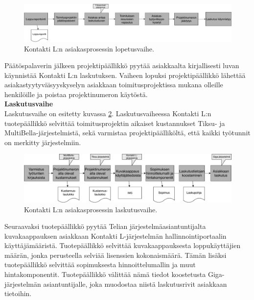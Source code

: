 \documentclass[finnish,12pt,a4paper,pdftex]{article}
\begin{document}
\begin{figure}[!h]
    \centering
    \includegraphics[scale=0.4]{images/lopetusvaihe.pdf}
    \caption{Kontakti L:n asiakasprosessin lopetusvaihe.}
    \label{fig:lopetus}
\end{figure}

Päätöspalaverin jälkeen projektipäällikkö pyytää asiakkaalta kirjallisesti luvan käynnistää Kontakti L:n laskutuksen. Vaiheen lopuksi projektipäällikkö lähettää asiakastyytyväisyyskyselyn asiakkaan toimitusprojektissa mukana olleille henkilöille ja poistaa projektinumeron käytöstä.\\

\textbf{Laskutusvaihe}\\

Laskutusvaihe on esitetty kuvassa \ref{fig:laskutus}. Laskutusvaiheessa Kontakti L:n tuotepäällikkö selvittää toimitusprojektin aikaiset kustannukset Tiksu- ja MultiBella-järjestelmistä, sekä varmistaa projektipäälliköltä, että kaikki työtunnit on merkitty järjestelmiin.\\

\begin{figure}[!h]
    \centering
    \includegraphics[scale=0.5]{images/laskutus.pdf}
    \caption{Kontakti L:n asiakasprosessin laskutusvaihe.}
    \label{fig:laskutus}
\end{figure}

Seuraavaksi tuotepäällikkö pyytää Telian järjestelmäasiantuntijalta kuvakaappauksen asiakkaan Kontakti L-järjestelmän hallinnointiportaalin käyttäjämääristä. Tuotepäällikkö selvittää kuvakaappauksesta loppukäyttäjien määrän, jonka perusteella selviää lisenssien kokonaismäärä. Tämän lisäksi tuotepäällikkö selvittää sopimuksesta hinnoittelumallin ja muut hintakomponentit. Tuotepäällikkö välittää nämä tiedot koostetusta Giga-järjestelmän asiantuntijalle, joka muodostaa niistä laskutusrivit asiakkaan tietoihin.\\
\end{document}
